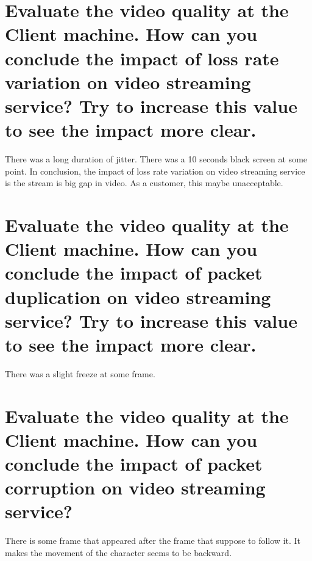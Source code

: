 \documentclass[11pt,a4paper]{article}
\begin{document}
	\section{Evaluate the video quality at the Client machine. How can you conclude the impact of loss rate variation on video streaming service? Try to increase this value to see the impact more clear.}
	There was a long duration of jitter. There was a 10 seconds black screen at some point.  In conclusion, the impact of loss rate variation on video streaming service is the stream is big gap in video. As a customer, this maybe unacceptable.
	
	\section{Evaluate the video quality at the Client machine. How can you conclude the impact of packet duplication on video streaming service? Try to increase this value to see the impact more clear.}
	There was a slight freeze at some frame.
	
	\section{Evaluate the video quality at the Client machine. How can you conclude the impact of packet corruption on video streaming service? }
	There is some frame that appeared after the frame that suppose to follow it. It makes the movement of the character seems to be backward.
\end{document}
